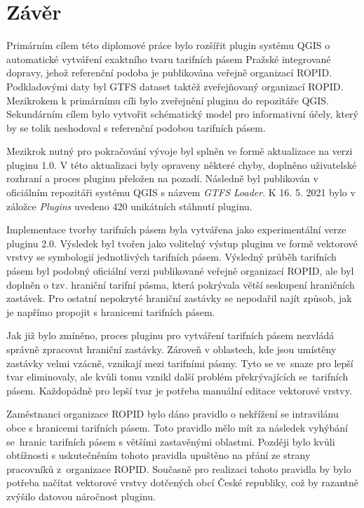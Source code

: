 \chapter*{Závěr}
\label{6-zaver}

Primárním cílem této diplomové práce bylo rozšířit plugin systému QGIS 
o automa\-tické vytváření exaktního tvaru tarifních pásem Pražské integrované dopravy, 
jehož referenční podoba je publikována veřejně organizací ROPID.  
Podkladovými daty byl GTFS dataset taktéž zveřejňovaný organizací ROPID.
Mezikrokem k primárnímu cíli bylo zveřejnění pluginu do repozitáře QGIS. Sekundárním cílem bylo vytvořit schématický model pro 
informativní účely, který by se tolik neshodoval s referenční podobou tarifních pásem.

Mezikrok nutný pro pokračování vývoje byl splněn ve formě aktualizace na verzi pluginu 1.0.
V této aktualizaci byly opraveny některé chyby, doplněno uživatelské rozhraní a proces pluginu přeložen na pozadí. 
Následně byl publikován v oficiálním repozitáři systému QGIS s názvem \textit{GTFS Loader}. 
K 16. 5. 2021 bylo v záložce \textit{Plugins} uvedeno 420 unikátních stáhnutí pluginu.

Implementace tvorby tarifních pásem byla vytvářena jako experimentální verze pluginu 2.0. Výsledek
byl tvořen jako volitelný výstup pluginu ve formě vektorové vrstvy se symbologií jednotlivých tarifních pásem.
Výsledný průběh tarifních pásem byl podobný oficiální verzi publikované veřejně organizací ROPID, ale byl doplněn o tzv. hraniční tarifní pásma,
která pokrývala větší seskupení hraničních zastávek. Pro ostatní nepokryté hraniční zastávky 
se nepodařil najít způsob, jak je napřímo propojit s hranicemi tarifních pásem.

Jak již bylo zmíněno, proces pluginu pro vytváření tarifních pásem nezvládá správně zpracovat hraniční zastávky.
Zároveň v oblastech, kde jsou umístěny zastávky velmi vzácně, vznikají  mezi tarifními pásmy.
Tyto  se ve~snaze pro lepší tvar eliminovaly, ale kvůli tomu vznikl další problém překrývajících se~ta\-rifních pásem.
Každopádně pro lepší tvar je potřeba manuální editace vektorové vrstvy.

Zaměstnanci organizace ROPID bylo dáno pravidlo o nekřížení se intravilánu obce s hranicemi tarifních pásem.
Toto pravidlo mělo mít za následek vyhýbání se~hranic tarifních pásem s většími zastavěnými oblastmi.
Později bylo kvůli obtíž\-nosti s uskutečněním tohoto pravidla upuštěno na přání ze strany pracovníků z~organizace ROPID.
Současně pro realizaci tohoto pravidla by bylo potřeba načítat vektorové vrstvy
dotčených obcí České republiky, což by razantně zvýšilo datovou náročnost pluginu.

